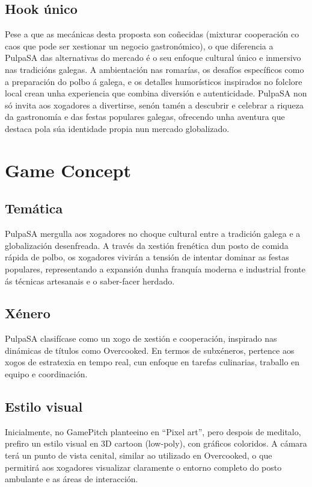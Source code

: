 \documentclass{report}  %
\begin{document}
\subsection{Hook único}
Pese a que as mecánicas desta proposta son coñecidas (mixturar cooperación 
co caos que pode ser xestionar un negocio gastronómico), o que diferencia a 
PulpaSA das alternativas do mercado é o seu enfoque cultural único e 
inmersivo nas tradicións galegas. A ambientación nas romarías, os desafíos 
específicos como a preparación do polbo á galega, e os detalles humorísticos 
inspirados no folclore local crean unha experiencia que combina diversión e 
autenticidade. PulpaSA non só invita aos xogadores a divertirse, senón tamén a 
descubrir e celebrar a riqueza da gastronomía e das festas populares galegas, 
ofrecendo unha aventura que destaca pola súa identidade propia nun mercado 
globalizado.

\section{Game Concept}

\subsection{Temática}
PulpaSA mergulla aos xogadores no choque cultural entre a tradición galega e a globalización desenfreada. A través da xestión frenética dun posto de comida rápida de polbo, os xogadores vivirán a tensión de intentar dominar as festas populares, representando a expansión dunha franquía moderna e industrial fronte ás técnicas artesanais e o saber-facer herdado. 

\subsection{Xénero}
PulpaSA clasifícase como un xogo de xestión e cooperación, inspirado nas 
dinámicas de títulos como Overcooked. En termos de subxéneros, pertence 
aos xogos de estratexia en tempo real, cun enfoque en tarefas culinarias, 
traballo en equipo e coordinación. 

\subsection{Estilo visual}
Inicialmente, no GamePitch planteeino en “Pixel art”, pero despois de meditalo, 
prefiro un estilo visual en 3D cartoon (low-poly), con gráficos coloridos. A cámara terá un 
punto de vista cenital, similar ao utilizado en Overcooked, o que permitirá aos 
xogadores visualizar claramente o entorno completo do posto ambulante e as 
áreas de interacción. 
\end{document}
